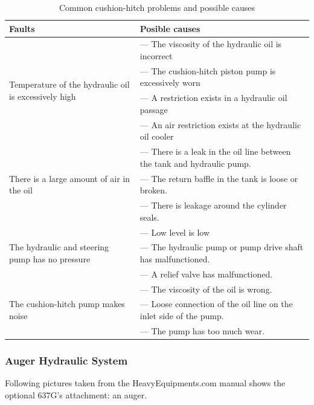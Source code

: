 \documentclass[a4paper,man,natbib]{apa6}
\begin{document}
\begin{table}[!htbp]
\centering
\begin{tabular} {| l | l |}
\hline
Faults & Posible causes\\
\hline
\multirow{4}{10em}{Temperature of the hydraulic oil is excessively high} & --- The viscosity of the hydraulic oil is incorrect\\
& --- The cushion-hitch piston pump is excessively worn\\
& --- A restriction exists in a hydraulic oil passage\\
& --- An air restriction exists at the hydraulic oil cooler\\
\hline
\multirow{3}{10em}{There is a large amount of air in the oil} & --- There is a leak in the oil line between the tank and hydraulic pump.\\
& --- The return baffle in the tank is loose or broken.\\
& --- There is leakage around the cylinder seals.\\
\hline
\multirow{3}{10em}{The hydraulic and steering pump has no pressure} & --- Low level is low\\
& --- The hydraulic pump or pump drive shaft has malfunctioned.\\
& --- A relief valve has malfunctioned.\\
\hline
\multirow{3}{10em}{The cushion-hitch pump makes noise} & --- The viscosity of the oil is wrong.\\
& --- Loose connection of the oil line on the inlet side of the pump.\\
& --- The pump has too much wear.\\ 
\hline
\end{tabular}
\caption{\label{tab:chtblch}Common cushion-hitch problems and possible causes}
\end{table}
\FloatBarrier{}

\subsubsection{Auger Hydraulic System}

Following pictures taken from the HeavyEquipments.com manual shows the optional 637G's attachment: an auger.
\end{document}
